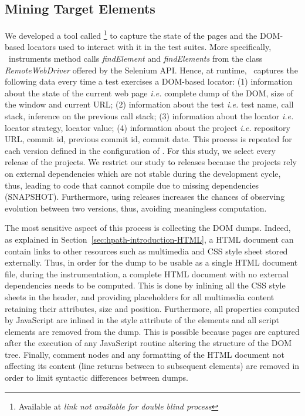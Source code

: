 \subsection{Mining Target Elements}
\label{sec:hpath-protocol-elements}

We developed a tool called \mercator\footnote{Available at \textit{link not available for double blind process}} to capture the state of the pages and the DOM-based locators used to interact with it in the test suites. More specifically, \mercator\ instruments method calls \emph{findElement} and \emph{findElements} from the class \emph{RemoteWebDriver} offered by the Selenium API. Hence, at runtime, \mercator\ captures the following data every time a test exercises a DOM-based locator: (1) information about the state of the current web page \emph{i.e.} complete dump of the DOM, size of the window and current URL; (2) information about the test \emph{i.e.} test name, call stack, inference on the previous call stack; (3) information about the locator \emph{i.e.} locator strategy, locator value; (4) information about the project \emph{i.e.} repository URL, commit id, previous commit id, commit date. This process is repeated for each version defined in the configuration of \mercator. For this study, we select every release of the projects. We restrict our study to releases because the projects rely on external dependencies which are not stable during the development cycle, thus, leading to code that cannot compile due to missing dependencies (SNAPSHOT). Furthermore, using releases increases the chances of observing evolution between two versions, thus, avoiding meaningless computation.

The most sensitive aspect of this process is collecting the DOM dumps. Indeed, as explained in Section~\ref{sec:hpath-introduction-HTML}, a HTML document can contain links to other resources such as multimedia and CSS style sheet stored externally. Thus, in order for the dump to be usable as a single HTML document file, during the instrumentation, a complete HTML document with no external dependencies needs to be computed. This is done by inlining all the CSS style sheets in the header, and providing placeholders for all multimedia content retaining their attributes, size and position. Furthermore, all properties computed by JavaScript are inlined in the style attribute of the elements and all script elements are removed from the dump. This is possible because pages are captured after the execution of any JavaScript routine altering the structure of the DOM tree. Finally, comment nodes and any formatting of the HTML document not affecting its content (line returns between to subsequent elements) are removed in order to limit syntactic differences between dumps.

